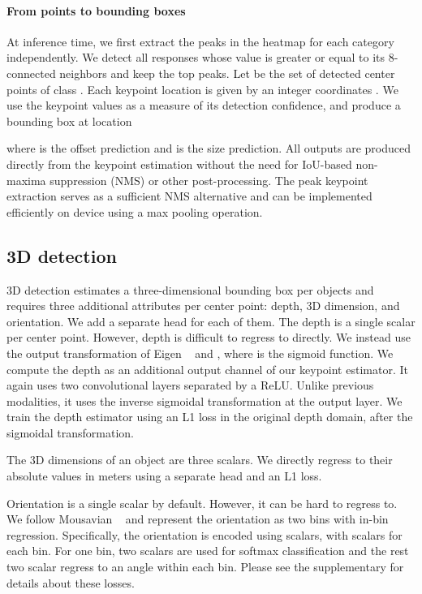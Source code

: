 \documentclass[10pt,twocolumn,letterpaper]{article}
\begin{document}
\paragraph{From points to bounding boxes}
At inference time, we first extract the peaks in the heatmap for each category independently.
We detect all responses whose value is greater or equal to its 8-connected neighbors and keep the top  peaks.
Let  be the set of  detected center points  of class .
Each keypoint location is given by an integer coordinates .
We use the keypoint values  as a measure of its detection confidence, and produce a bounding box at location

where  is the offset prediction and  is the size prediction.
All outputs are produced directly from the keypoint estimation without the need for IoU-based non-maxima suppression (NMS) or other post-processing.
The peak keypoint extraction serves as a sufficient NMS alternative and can be implemented efficiently on device using a  max pooling operation.

\subsection{3D detection}

3D detection estimates a three-dimensional bounding box per objects and requires three additional attributes per center point: depth, 3D dimension, and orientation.
We add a separate head for each of them.
The depth  is a single scalar per center point.
However, depth is difficult to regress to directly.
We instead use the output transformation of Eigen \etal~\cite{eigen2014depth} and , where  is the sigmoid function.
We compute the depth as an additional output channel  of our keypoint estimator.
It again uses two convolutional layers separated by a ReLU.
Unlike previous modalities, it uses the inverse sigmoidal transformation at the output layer.
We train the depth estimator using an L1 loss in the original depth domain, after the sigmoidal transformation.

The 3D dimensions of an object are three scalars.
We directly regress to their absolute values in meters using a separate head  and an L1 loss.

Orientation is a single scalar by default.
However, it can be hard to regress to.
We follow Mousavian \etal~\cite{mousavian20173d} and represent the orientation as two bins with in-bin regression.
Specifically, the orientation is encoded using  scalars, with  scalars for each bin.
For one bin, two scalars are used for softmax classification and the rest two scalar regress to an angle within each bin.
Please see the supplementary for details about these losses.
\end{document}
